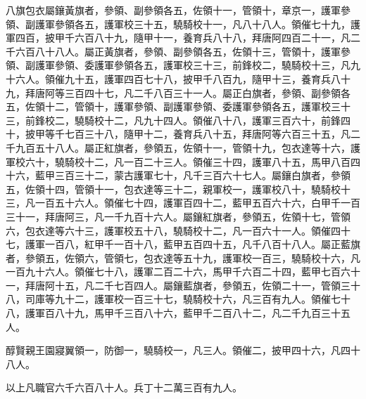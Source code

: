 \begin{pinyinscope}
八旗包衣屬鑲黃旗者，參領、副參領各五，佐領十一，管領十，章京一，護軍參領、副護軍參領各五，護軍校三十五，驍騎校十一，凡八十八人。領催七十九，護軍四百，披甲千六百八十九，隨甲十一，養育兵八十八，拜唐阿四百二十一，凡二千六百八十八人。屬正黃旗者，參領、副參領各五，佐領十三，管領十，護軍參領、副護軍參領、委護軍參領各五，護軍校三十三，前鋒校二，驍騎校十三，凡九十六人。領催九十五，護軍四百七十八，披甲千八百九，隨甲十三，養育兵八十九，拜唐阿等三百四十七，凡二千八百三十一人。屬正白旗者，參領、副參領各五，佐領十二，管領十，護軍參領、副護軍參領、委護軍參領各五，護軍校三十三，前鋒校二，驍騎校十二，凡九十四人。領催八十八，護軍三百六十，前鋒四十，披甲等千七百三十八，隨甲十二，養育兵八十五，拜唐阿等六百三十五，凡二千九百五十八人。屬正紅旗者，參領五，佐領十一，管領十九，包衣達等十六，護軍校六十，驍騎校十二，凡一百二十三人。領催三十四，護軍八十五，馬甲八百四十六，藍甲三百三十二，蒙古護軍七十，凡千三百六十七人。屬鑲白旗者，參領五，佐領十四，管領十一，包衣達等三十二，親軍校一，護軍校八十，驍騎校十三，凡一百五十六人。領催七十四，護軍百四十二，藍甲五百六十六，白甲千一百三十一，拜唐阿三，凡一千九百十六人。屬鑲紅旗者，參領五，佐領十七，管領六，包衣達等六十三，護軍校五十八，驍騎校十二，凡一百六十一人。領催四十七，護軍一百八，紅甲千一百十八，藍甲五百四十五，凡千八百十八人。屬正藍旗者，參領五，佐領六，管領七，包衣達等五十九，護軍校一百三，驍騎校十六，凡一百九十六人。領催七十八，護軍二百二十六，馬甲千六百二十四，藍甲七百六十一，拜唐阿十五，凡二千七百四人。屬鑲藍旗者，參領五，佐領二十一，管領三十八，司庫等九十二，護軍校一百三十七，驍騎校十六，凡三百有九人。領催七十八，護軍百八十九，馬甲千三百八十六，藍甲千二百八十二，凡二千九百三十五人。

醇賢親王園寢翼領一，防御一，驍騎校一，凡三人。領催二，披甲四十六，凡四十八人。

以上凡職官六千六百八十人。兵丁十二萬三百有九人。


\end{pinyinscope}